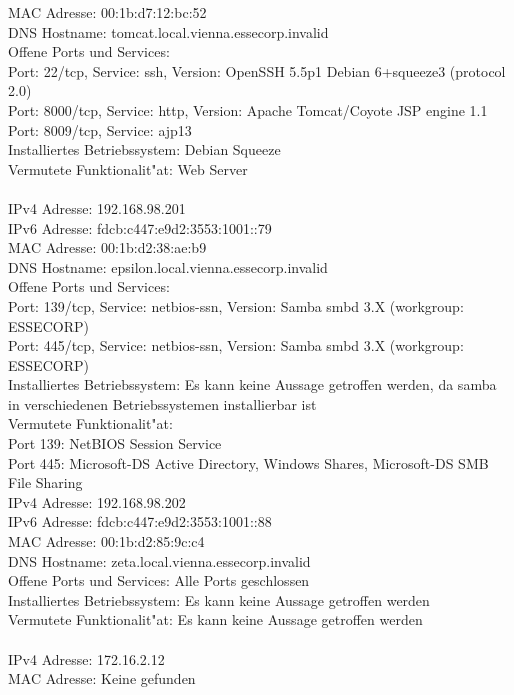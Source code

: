 \documentclass[12pt,a4paper,titlepage,oneside]{scrartcl}
\begin{document}
MAC Adresse: 00:1b:d7:12:bc:52\\
DNS Hostname: tomcat.local.vienna.essecorp.invalid\\
Offene Ports und Services:\\
Port: 22/tcp, Service: ssh, Version: OpenSSH 5.5p1 Debian 6+squeeze3 (protocol 2.0)\\
Port: 8000/tcp, Service: http, Version: Apache Tomcat/Coyote JSP engine 1.1\\
Port: 8009/tcp, Service: ajp13\\
Installiertes Betriebssystem: Debian Squeeze\\
Vermutete Funktionalit"at: Web Server\\
\\
IPv4 Adresse: 192.168.98.201\\
IPv6 Adresse: fdcb:c447:e9d2:3553:1001::79\\
MAC Adresse: 00:1b:d2:38:ae:b9\\
DNS Hostname: epsilon.local.vienna.essecorp.invalid\\
Offene Ports und Services:\\
Port: 139/tcp, Service: netbios-ssn, Version: Samba smbd 3.X (workgroup: ESSECORP)\\
Port: 445/tcp, Service: netbios-ssn, Version: Samba smbd 3.X (workgroup: ESSECORP)\\
Installiertes Betriebssystem: Es kann keine Aussage getroffen werden, da samba in verschiedenen Betriebssystemen installierbar ist\\
Vermutete Funktionalit"at:\\
Port 139: NetBIOS Session Service\\
Port 445: Microsoft-DS Active Directory, Windows Shares, Microsoft-DS SMB File Sharing
\\
IPv4 Adresse: 192.168.98.202\\
IPv6 Adresse: fdcb:c447:e9d2:3553:1001::88\\
MAC Adresse: 00:1b:d2:85:9c:c4\\
DNS Hostname: zeta.local.vienna.essecorp.invalid\\
Offene Ports und Services: Alle Ports geschlossen\\
Installiertes Betriebssystem: Es kann keine Aussage getroffen werden\\
Vermutete Funktionalit"at: Es kann keine Aussage getroffen werden\\
\\
IPv4 Adresse: 172.16.2.12\\
MAC Adresse: Keine gefunden\\
\end{document}
